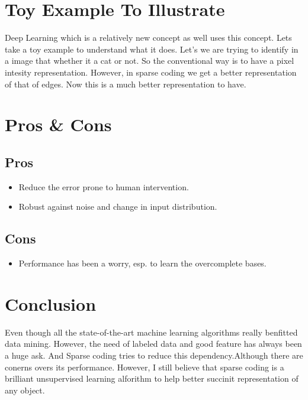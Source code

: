 \documentclass[journal]{IEEEtran}
\begin{document}
\section{Toy Example To Illustrate}
Deep Learning which is a relatively new concept as well uses this concept. Lets take a toy example to understand what it does. Let's we are trying to identify in a image that whether it a cat or not. So the conventional way is to have a pixel intesity representation. However, in sparse coding we get a better representation of that of edges. Now this is a much better representation to have.

\section{Pros \& Cons}
\subsection{Pros}
\begin{itemize}
	\renewcommand{\labelitemi}{$\bullet$}
	\item Reduce the error prone to human intervention.
	\item Robust against noise and change in input distribution.
\end{itemize}

\subsection{Cons}
\begin{itemize}
	\renewcommand{\labelitemi}{$\bullet$}
	\item Performance has been a worry, esp. to learn the overcomplete bases.

\end{itemize}



\section{Conclusion}
Even though all the state-of-the-art machine learning algorithms really benfitted data mining. However, the need of labeled data and good feature has always been a huge ask. And Sparse coding tries to reduce this dependency.Although there are conerns overs its performance. However, I still believe that sparse coding is a brilliant unsupervised learning alforithm to help better succinit representation of any object.
\end{document}
